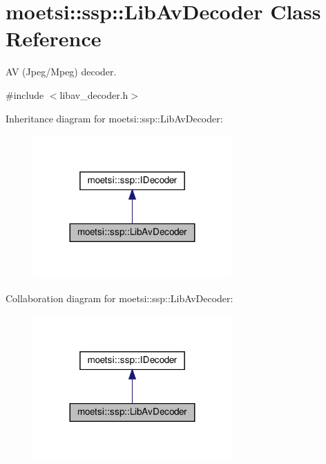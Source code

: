 \hypertarget{classmoetsi_1_1ssp_1_1LibAvDecoder}{}\section{moetsi\+:\+:ssp\+:\+:Lib\+Av\+Decoder Class Reference}
\label{classmoetsi_1_1ssp_1_1LibAvDecoder}


AV (Jpeg/\+Mpeg) decoder.  




{\ttfamily \#include $<$libav\+\_\+decoder.\+h$>$}



Inheritance diagram for moetsi\+:\+:ssp\+:\+:Lib\+Av\+Decoder\+:\nopagebreak
\begin{figure}[H]
\begin{center}
\leavevmode
\includegraphics[width=215pt]{classmoetsi_1_1ssp_1_1LibAvDecoder__inherit__graph}
\end{center}
\end{figure}


Collaboration diagram for moetsi\+:\+:ssp\+:\+:Lib\+Av\+Decoder\+:\nopagebreak
\begin{figure}[H]
\begin{center}
\leavevmode
\includegraphics[width=215pt]{classmoetsi_1_1ssp_1_1LibAvDecoder__coll__graph}
\end{center}
\end{figure}
